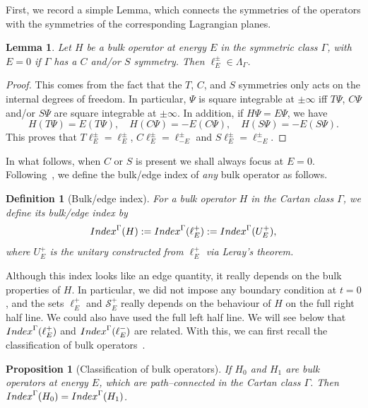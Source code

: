 \documentclass[11pt]{amsart}
\numberwithin{equation}{section} %
\newtheorem{proposition}[theorem]{Proposition}
\newtheorem{lemma}[theorem]{Lemma}
\newtheorem{definition}[theorem]{Definition}
\newcommand\1{{\mathds 1}}
\def\cS{{\mathcal S}}
\def\Index{{\rm Index}}
\begin{document}
First, we record a simple Lemma, which connects the symmetries of the operators with the symmetries of the corresponding Lagrangian planes.
\begin{lemma}
    Let $H$ be a bulk operator at energy $E$ in the symmetric class $\Gamma$, with $E = 0$ if $\Gamma$ has a $C$ and/or $S$ symmetry. Then $\ell_E^\pm \in \Lambda_\Gamma$.
\end{lemma}

\begin{proof}
    This comes from the fact that the $T$, $C$, and $S$ symmetries only acts on the internal degrees of freedom. In particular, $\Psi$ is square integrable at $\pm \infty$ iff $T \Psi$, $C \Psi$ and/or $S \Psi$ are square integrable at $\pm \infty$. In addition, if $H \Psi = E \Psi$, we have
    \[
        H(T \Psi) = E(T \Psi), \quad H(C \Psi) = - E (C \Psi) , \quad H(S \Psi) = - E (S \Psi).
    \]
    This proves that $T \ell_E^\pm = \ell_E^\pm$, $C \ell_E^\pm = \ell_{-E}^\pm$ and $S \ell_E^\pm = \ell_{-E}^\pm$.
\end{proof}
In what follows, when $C$ or $S$ is present we shall always focus at $E=0$. Following~\cite{Gon-23}, we define the bulk/edge index of {\em any} bulk operator as follows.

\begin{definition}[Bulk/edge index]
    For a bulk operator $H$ in the Cartan class $\Gamma$, we define its bulk/edge index by
    \[
        \Index^\Gamma(H) := \Index^\Gamma(\ell_E^+) :=  \Index^\Gamma(U_E^+),
    \]
    where $U_E^+$ is the unitary constructed from $\ell_E^+$ via Leray's theorem.
\end{definition}
Although this index looks like an edge quantity, it really depends on the bulk properties of $H$. In particular, we did not impose any boundary condition at $t = 0$, and the sets $\ell_E^+$ and $\cS_E^+$ really depends on the behaviour of $H$ on the full right half line. We could also have used the full left half line. We will see below that $\Index^\Gamma(\ell_E^+)$ and $\Index^\Gamma(\ell_E^-)$ are related. With this, we can first recall the classification of bulk operators~\cite{Kit-09, RyuSchFur-10}.
\begin{proposition}[Classification of bulk operators]
    If $H_0$ and $H_1$ are bulk operators at energy $E$, which are path--connected in the Cartan class $\Gamma$. Then $\Index^\Gamma(H_0) = \Index^\Gamma(H_1)$.
\end{proposition}
\end{document}
